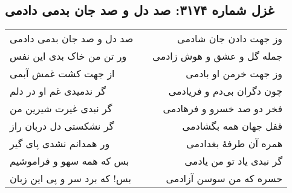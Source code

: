 \begin{center}
\section*{غزل شماره ۳۱۷۴: صد دل و صد جان بدمی دادمی}
\label{sec:3174}
\begin{longtable}{l p{0.5cm} r}
صد دل و صد جان بدمی دادمی
&&
وز جهت دادن جان شادمی
\\
ور تن من خاک بدی این نفس
&&
جمله گل و عشق و هوش زادمی
\\
از جهت کشت غمش آبمی
&&
وز جهت خرمن او بادمی
\\
گر ندمیدی غم او در دلم
&&
چون دگران بی‌دم و فریادمی
\\
گر نبدی غیرت شیرین من
&&
فخر دو صد خسرو و فرهادمی
\\
گر نشکستی دل دربان راز
&&
قفل جهان همه بگشادمی
\\
ور همدانم نشدی پای گیر
&&
همره آن طرفهٔ بغدادمی
\\
بس که همه سهو و فراموشیم
&&
گر نبدی یاد تو من یادمی
\\
بس! که برد سر و پی این زبان
&&
حسره که من سوسن آزادمی
\\
\end{longtable}
\end{center}
